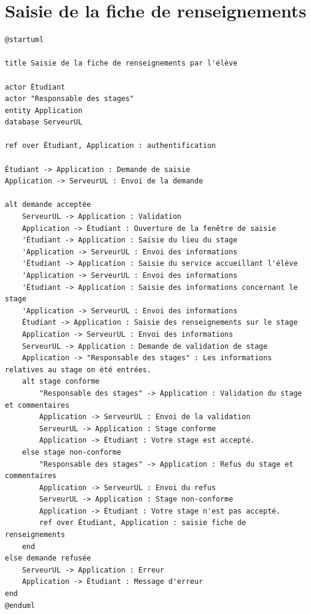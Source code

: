 \documentclass[11pt, a4paper]{report}
\begin{document}
\section*{Saisie de la fiche de renseignements}
\begin{verbatim}
@startuml

title Saisie de la fiche de renseignements par l'élève

actor Étudiant
actor "Responsable des stages"
entity Application
database ServeurUL

ref over Étudiant, Application : authentification

Étudiant -> Application : Demande de saisie
Application -> ServeurUL : Envoi de la demande 

alt demande acceptée
	ServeurUL -> Application : Validation
	Application -> Étudiant : Ouverture de la fenêtre de saisie
	'Étudiant -> Application : Saisie du lieu du stage
	'Application -> ServeurUL : Envoi des informations
	'Étudiant -> Application : Saisie du service accueillant l'élève
	'Application -> ServeurUL : Envoi des informations
	'Étudiant -> Application : Saisie des informations concernant le stage
	'Application -> ServeurUL : Envoi des informations
	Étudiant -> Application : Saisie des renseignements sur le stage
	Application -> ServeurUL : Envoi des informations
	ServeurUL -> Application : Demande de validation de stage
	Application -> "Responsable des stages" : Les informations relatives au stage on été entrées.
	alt stage conforme
		"Responsable des stages" -> Application : Validation du stage et commentaires
		Application -> ServeurUL : Envoi de la validation
		ServeurUL -> Application : Stage conforme
		Application -> Étudiant : Votre stage est accepté.
	else stage non-conforme
		"Responsable des stages" -> Application : Refus du stage et commentaires
		Application -> ServeurUL : Envoi du refus
		ServeurUL -> Application : Stage non-conforme
		Application -> Étudiant : Votre stage n'est pas accepté.
		ref over Étudiant, Application : saisie fiche de renseignements
	end
else demande refusée
	ServeurUL -> Application : Erreur
	Application -> Étudiant : Message d'erreur
end
@enduml
\end{verbatim}
\end{document}
